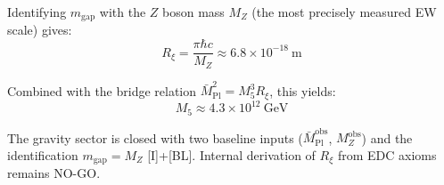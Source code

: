 \documentclass[11pt,a4paper]{article}
\newcommand{\Rxi}{R_\xi}
\newcommand{\Mplbar}{\bar{M}_{\mathrm{Pl}}}
\newcommand{\Mfive}{M_5}
\newcommand{\MZ}{M_Z}
\newcommand{\mgap}{m_{\mathrm{gap}}}
\begin{document}
Identifying $\mgap$ with the $Z$ boson mass $\MZ$ (the most precisely measured
EW scale) gives:
\begin{equation}
\Rxi = \frac{\pi \hbar c}{\MZ} \approx 6.8 \times 10^{-18}~\mathrm{m}
\end{equation}

Combined with the bridge relation $\Mplbar^2 = \Mfive^3 \Rxi$, this yields:
\begin{equation}
\Mfive \approx 4.3 \times 10^{12}~\mathrm{GeV}
\end{equation}

The gravity sector is closed with two baseline inputs ($\Mplbar^{\mathrm{obs}}$,
$\MZ^{\mathrm{obs}}$) and the identification $\mgap = \MZ$ [I]+[BL]. Internal
derivation of $\Rxi$ from EDC axioms remains NO-GO.
\end{document}
